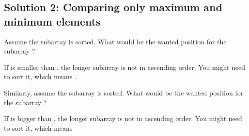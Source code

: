 \documentclass[letterpaper,12pt,english]{book}
\begin{document}
\subsection{Solution 2: Comparing only maximum and minimum elements}
\label{\detokenize{Two_Pointers/08_TP_581_Shortest_Unsorted_Continuous_Subarray:solution-2-comparing-only-maximum-and-minimum-elements}}
\sphinxAtStartPar
Assume the subarray  is sorted. What would be the wanted  position for the subarray ?

\sphinxAtStartPar
If  is smaller than , the longer subarray  is not in ascending order. You might need to sort it, which means .

\sphinxAtStartPar
Similarly, assume the subarray  is sorted. What would be the wanted  position for the subarray ?

\sphinxAtStartPar
If  is bigger than , the longer subarray  is not in ascending order. You might need to sort it,  which means 
\end{document}

